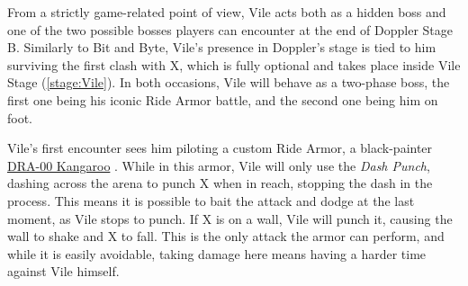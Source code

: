 From a strictly game-related point of view, Vile acts both as a hidden boss and one of the two possible bosses players can encounter at the end of Doppler Stage B. Similarly to Bit and Byte, Vile's presence in Doppler's stage is tied to him surviving the first clash with X, which is fully optional and takes place inside Vile Stage (\ref{stage:Vile}). In both occasions, Vile will behave as a two-phase boss, the first one being his iconic Ride Armor battle, and the second one being him on foot.

Vile's first encounter sees him piloting a custom Ride Armor, a black-painter \hyperlink{vehicle:Ride_Armor_Kangaroo}{DRA-00 Kangaroo} . While in this armor, Vile will only use the \emph{Dash Punch}, dashing across the arena to punch X when in reach, stopping the dash in the process. This means it is possible to bait the attack and dodge at the last moment, as Vile stops to punch. If X is on a wall, Vile will punch it, causing the wall to shake and X to fall. This is the only attack the armor can perform, and while it is easily avoidable, taking damage here means having a harder time against Vile himself.



